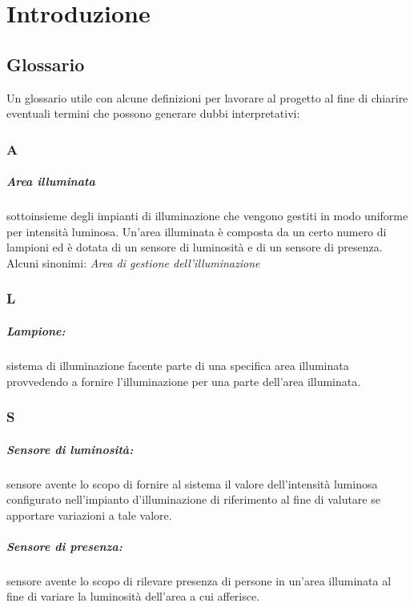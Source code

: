 \chapter{Introduzione}

\section{Glossario}
Un glossario utile con alcune definizioni per lavorare al progetto al fine di chiarire eventuali termini che possono generare dubbi interpretativi:

\subsection*{A}

\paragraph{Area illuminata} sottoinsieme degli impianti di illuminazione che vengono gestiti in modo uniforme per intensità luminosa. Un'area illuminata è composta da un certo numero di lampioni ed è dotata di un sensore di luminosità e di un sensore di presenza. Alcuni sinonimi: \textit{Area di gestione dell'illuminazione}

\subsection*{L}
\paragraph{Lampione:} sistema di illuminazione facente parte di una specifica area illuminata provvedendo a fornire l'illuminazione per una parte dell'area illuminata.

\subsection*{S}
\paragraph{Sensore di luminosità:} sensore avente lo scopo di fornire al sistema il valore dell'intensità luminosa configurato nell'impianto d'illuminazione di riferimento al fine di valutare se apportare variazioni a tale valore.

\paragraph{Sensore di presenza:} sensore avente lo scopo di rilevare presenza di persone in un'area illuminata al fine di variare la luminosità dell'area a cui afferisce.

